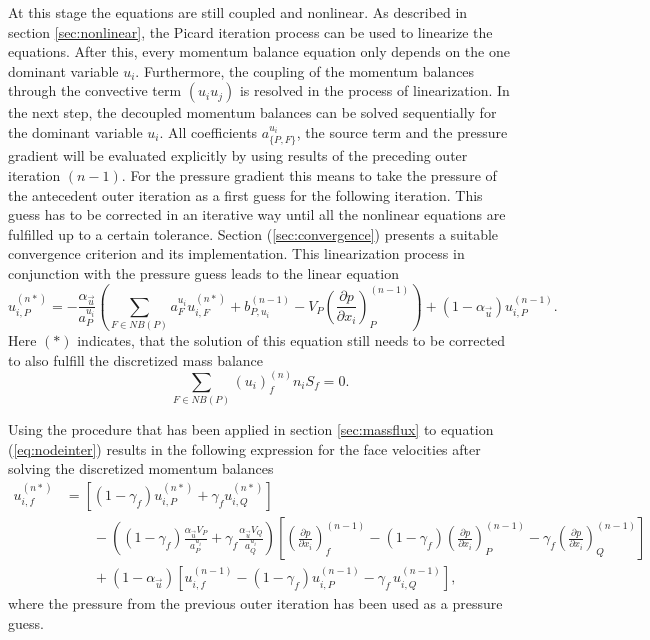 At this stage the equations are still coupled and nonlinear. As described in section \ref{sec:nonlinear}, the Picard iteration process can be used to linearize the equations. After this, every momentum balance equation only depends on the one dominant variable \(u_i\). Furthermore, the coupling of the momentum balances through the convective term \((u_i u_j)\) is resolved in the process of linearization. In the next step, the decoupled momentum balances can be solved sequentially for the dominant variable \(u_i\). All coefficients \(a_{\{P,F\}}^{u_i}\), the source term and the pressure gradient will be evaluated explicitly by using results of the preceding outer iteration \((n-1)\). For the pressure gradient this means to take the pressure of the antecedent outer iteration as a first guess for the following iteration. This guess has to be corrected in an iterative way until all the nonlinear equations are fulfilled up to a certain tolerance. Section (\ref{sec:convergence}) presents a suitable convergence criterion and its implementation. This linearization process in conjunction with the pressure guess leads to the linear equation 
\begin{equation}
  \label{eq:nodeinter}
  u_{i,P}^{(n*)} 
  = 
  - \frac{\alpha_{\vec{u}}}{a_P^{u_i}} \left(\sum_{F \in NB(P)} a_F^{u_i} u_{i,F}^{(n*)}
  +                                     b_{P,u_i}^{(n-1)} 
  -                                     V_P\left(\frac{\partial p}{\partial x_i}\right)_P^{(n-1)} \right)
  + \left(1 - \alpha_{\vec{u}}\right) u_{i,P}^{(n-1)}.
\end{equation}
Here \((*)\) indicates, that the solution of this equation still needs to be corrected to also fulfill the discretized mass balance
\begin{equation}
  \label{eq:contisemi}
  \sum_{F \in NB(P)} (u_i)_f^{(n)} n_i S_f = 0.
\end{equation}

Using the procedure that has been applied in section \ref{sec:massflux} to equation (\ref{eq:nodeinter}) results in the following expression for the face velocities after solving the discretized momentum balances 
\begin{align}
  \label{eq:faceinter}
  u_{i,f}^{(n*)} 
  &=
  \left[\left(1 - \gamma_f\right) u_{i,P}^{(n*)} + \gamma_f u_{i,Q}^{(n*)} \right] \nonumber \\[1em]
  &\quad\quad - 
  \left(\left(1 - \gamma_f\right) \frac{\alpha_\vec{u} V_P}{a_P^{u_i}} + \gamma_f \frac{\alpha_\vec{u} V_Q}{a_Q^{u_i}}\right)
  \left[ 
  \left(\frac{\partial p}{\partial x_i}\right)_f^{(n-1)} 
  - \left( 1 - \gamma_f \right) \left( \frac{\partial p}{\partial x_i} \right)_P^{(n-1)} 
  - \gamma_f \left(\frac{\partial p}{\partial x_i}\right)_Q^{(n-1)}
  \right] \nonumber \\[1em]
  &\quad\quad + \left(1 - \alpha_\vec{u}\right) \left[ u_{i,f}^{(n-1)} - \left(1 - \gamma_f\right) u_{i,P}^{(n-1)} - \gamma_f \, u_{i,Q}^{(n-1)} \right],
\end{align}
where the pressure from the previous outer iteration has been used as a pressure guess.

